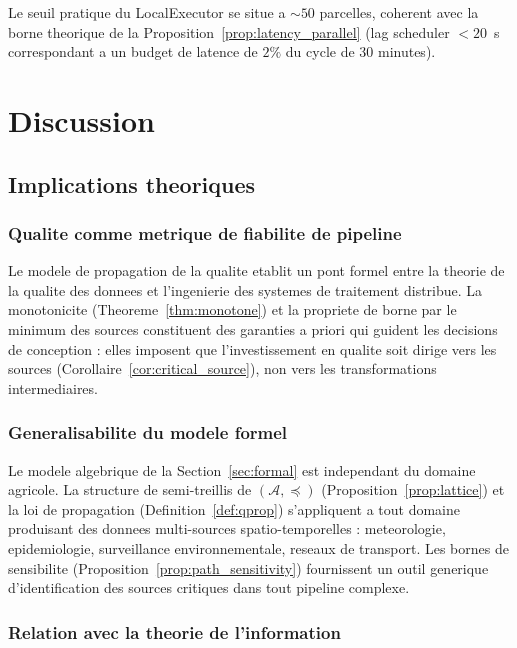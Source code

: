 \documentclass[12pt,a4paper]{article}
\theoremstyle{plain}
\theoremstyle{definition}
\theoremstyle{remark}
\begin{document}
Le seuil pratique du LocalExecutor se situe a $\sim 50$ parcelles,
coherent avec la borne theorique de la Proposition~\ref{prop:latency_parallel}
(lag scheduler $< 20$~s correspondant a un budget de latence
de $2\%$ du cycle de 30 minutes).

\section{Discussion}
\label{sec:discussion}

\subsection{Implications theoriques}

\subsubsection{Qualite comme metrique de fiabilite de pipeline}

Le modele de propagation de la qualite etablit un pont formel entre
la theorie de la qualite des donnees \cite{data_lineage_quality} et
l'ingenierie des systemes de traitement distribue. La monotonicite
(Theoreme~\ref{thm:monotone}) et la propriete de borne par le minimum
des sources constituent des garanties a priori qui guident les decisions
de conception : elles imposent que l'investissement en qualite soit
dirige vers les sources (Corollaire~\ref{cor:critical_source}),
non vers les transformations intermediaires.

\subsubsection{Generalisabilite du modele formel}

Le modele algebrique de la Section~\ref{sec:formal} est independant
du domaine agricole. La structure de semi-treillis de $(\mathcal{A},\preceq)$
(Proposition~\ref{prop:lattice}) et la loi de propagation
(Definition~\ref{def:qprop}) s'appliquent a tout domaine produisant
des donnees multi-sources spatio-temporelles : meteorologie, epidemiologie,
surveillance environnementale, reseaux de transport. Les bornes de
sensibilite (Proposition~\ref{prop:path_sensitivity}) fournissent
un outil generique d'identification des sources critiques dans tout
pipeline complexe.

\subsubsection{Relation avec la theorie de l'information}
\end{document}

